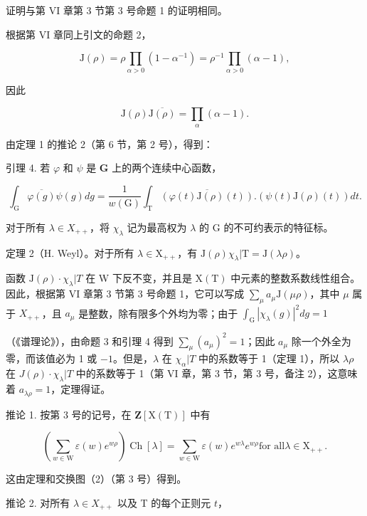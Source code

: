 证明与第 VI 章第 3 节第 3 号命题 1 的证明相同。

根据第 VI 章同上引文的命题 2，

\[
\mathrm{J} (\rho) = \rho \prod_ {\alpha > 0} (1 - \alpha^ {- 1}) = \rho^ {- 1} \prod_ {\alpha > 0} (\alpha - 1),\tag{3}
\]

因此

\[
\mathrm{J} (\rho) \overline {{\mathrm{J} (\rho)}} = \prod_ {\alpha} (\alpha - 1).\tag{4}
\]

由定理 1 的推论 2（第 6 节，第 2 号），得到：

引理 4. 若 \(\varphi\) 和 \(\psi\) 是 \(\mathbf{G}\) 上的两个连续中心函数，

\[
\int_ {\mathrm{G}} \overline {{\varphi (g)}} \psi (g) d g = \frac {1}{w (\mathrm{G})} \int_ {\mathrm{T}} \overline {{(\varphi (t) \mathrm{J} (\rho) (t))}}. (\psi (t) \mathrm{J} (\rho) (t)) d t.
\]

对于所有 \(\lambda\in X_{++}\)，将 \(\chi_{\lambda}\) 记为最高权为 \(\lambda\) 的 G 的不可约表示的特征标。

定理 2（H. Weyl）。对于所有 \(\lambda \in \mathrm{X}_{++}\)，有 \(\mathrm{J}(\rho)\chi_{\lambda}|\mathrm{T} = \mathrm{J}(\lambda \rho)\)。

函数 \(\mathrm{J}(\rho)\cdot\chi_{\lambda}|T\) 在 W 下反不变，并且是 \(\mathrm{X(T)}\) 中元素的整数系数线性组合。因此，根据第 VI 章第 3 节第 3 号命题 1，它可以写成 \(\sum_{\mu}a_{\mu}\mathrm{J}(\mu\rho)\)，其中 \(\mu\) 属于 \(X_{++}\)，且 \(a_{\mu}\) 是整数，除有限多个外均为零；由于 \(\int_{\mathrm{G}}|\chi_{\lambda}(g)|^{2}dg=1\)

（《谱理论》），由命题 3 和引理 4 得到 \(\sum_{\mu}(a_{\mu})^{2} = 1\)；因此 \(a_{\mu}\) 除一个外全为零，而该值必为 1 或 \(-1\)。但是，\(\lambda\) 在 \(\chi_{\alpha}|T\) 中的系数等于 1（定理 1），所以 \(\lambda \rho\) 在 \(J(\rho)\cdot \chi_{\lambda}|T\) 中的系数等于 1（第 VI 章，第 3 节，第 3 号，备注 2），这意味着 \(a_{\lambda \rho} = 1\)，定理得证。

推论 1. 按第 3 号的记号，在 \(\mathbf{Z}[\mathrm{X(T)}]\) 中有

\[
\left(\sum_ {w \in \mathrm{W}} \varepsilon (w) e ^ {w \rho}\right) \operatorname{Ch} [ \lambda ] = \sum_ {w \in \mathrm{W}} \varepsilon (w) e ^ {w \lambda} e ^ {w \rho} \text {for all} \lambda \in \mathrm{X} _ {+ +}.
\]

这由定理和交换图（2）（第 3 号）得到。

推论 2. 对所有 \(\lambda \in X_{++}\) 以及 T 的每个正则元 \(t\)，


